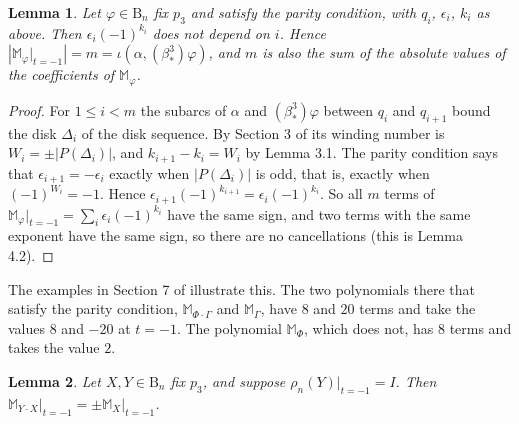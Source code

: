 \documentclass[11pt]{amsart}
\newtheorem{lemma}{Lemma}
\theoremstyle{remark}
\newcommand{\M}{\mathbb{M}}
\newcommand{\B}{\mathrm{B}}
\newcommand{\bs}{\beta^3_*}
\newcommand{\at}{\big|_{t=-1}}
\begin{document}
\begin{lemma}\label{lem:sign}
Let $\varphi\in \B_n$ fix $p_3$ and satisfy the parity condition, with $q_i$, $\epsilon_i$, $k_i$ as above. Then $\epsilon_i(-1)^{k_i}$ does not depend on $i$. Hence $|\M_\varphi\at|=m=\iota(\alpha,(\bs)\varphi)$, and $m$ is also the sum of the absolute values of the coefficients of $\M_\varphi$.
\end{lemma}

\begin{proof}
For $1\le i<m$ the subarcs of $\alpha$ and $(\bs)\varphi$ between $q_i$ and $q_{i+1}$ bound the disk $\Delta_i$ of the disk sequence. By Section 3 of \cite{BBB} its winding number is $W_i=\pm|P(\Delta_i)|$, and $k_{i+1}-k_i=W_i$ by Lemma 3.1. The parity condition says that $\epsilon_{i+1}=-\epsilon_i$ exactly when $|P(\Delta_i)|$ is odd, that is, exactly when $(-1)^{W_i}=-1$. Hence $\epsilon_{i+1}(-1)^{k_{i+1}}=\epsilon_i(-1)^{k_i}$. So all $m$ terms of $\M_\varphi\at=\sum_i\epsilon_i(-1)^{k_i}$ have the same sign, and two terms with the same exponent have the same sign, so there are no cancellations (this is Lemma 4.2).
\end{proof}

The examples in Section 7 of \cite{BBB} illustrate this. The two polynomials there that satisfy the parity condition, $\M_{\Phi\cdot\Gamma}$ and $\M_\Gamma$, have $8$ and $20$ terms and take the values $8$ and $-20$ at $t=-1$. The polynomial $\M_\Phi$, which does not, has $8$ terms and takes the value $2$.

\begin{lemma}\label{lem:tminus1}
Let $X,Y\in \B_n$ fix $p_3$, and suppose $\rho_n(Y)\at=I$. Then $\M_{Y\cdot X}\at=\pm\M_X\at$.
\end{lemma}
\end{document}
